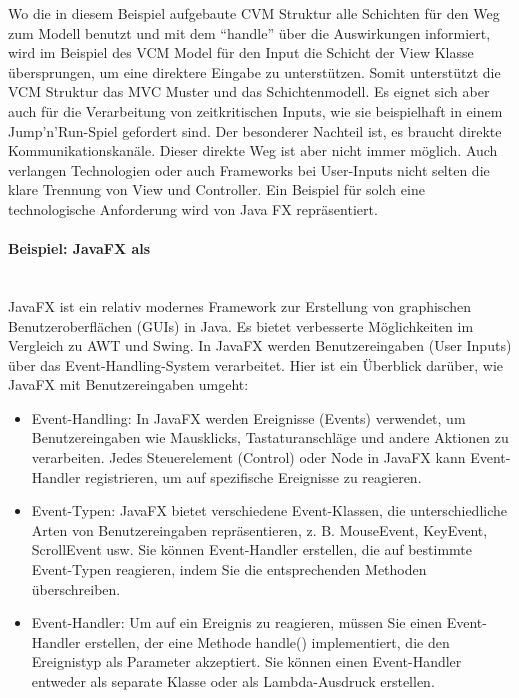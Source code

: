 Wo die in diesem Beispiel aufgebaute CVM Struktur alle Schichten für den Weg zum Modell benutzt und mit dem \enquote{handle} über die Auswirkungen informiert, wird im Beispiel des VCM Model für den Input die Schicht der View Klasse übersprungen, um eine direktere Eingabe zu unterstützen. Somit unterstützt die VCM Struktur das MVC Muster und das Schichtenmodell. Es eignet  sich aber auch für die Verarbeitung von zeitkritischen Inputs, wie sie beispielhaft in einem Jump'n'Run-Spiel gefordert sind. Der besonderer Nachteil ist, es braucht direkte Kommunikationskanäle. Dieser direkte Weg ist aber nicht immer möglich. Auch verlangen Technologien oder auch Frameworks bei User-Inputs nicht selten die klare Trennung von View und Controller. Ein Beispiel für solch eine technologische Anforderung wird von Java FX repräsentiert.     

\paragraph{Beispiel: JavaFX als\\\\}
JavaFX ist ein relativ modernes Framework zur Erstellung von graphischen Benutzeroberflächen (GUIs) in Java. Es bietet verbesserte Möglichkeiten im Vergleich zu AWT und Swing. In JavaFX werden Benutzereingaben (User Inputs) über das Event-Handling-System verarbeitet. Hier ist ein Überblick darüber, wie JavaFX mit Benutzereingaben umgeht:
\begin{itemize}
\item Event-Handling: In JavaFX werden Ereignisse (Events) verwendet, um Benutzereingaben wie Mausklicks, Tastaturanschläge und andere Aktionen zu verarbeiten. Jedes Steuerelement (Control) oder Node in JavaFX kann Event-Handler registrieren, um auf spezifische Ereignisse zu reagieren.
\item Event-Typen: JavaFX bietet verschiedene Event-Klassen, die unterschiedliche Arten von Benutzereingaben repräsentieren, z. B. MouseEvent, KeyEvent, ScrollEvent usw. Sie können Event-Handler erstellen, die auf bestimmte Event-Typen reagieren, indem Sie die entsprechenden Methoden überschreiben.
\item Event-Handler: Um auf ein Ereignis zu reagieren, müssen Sie einen Event-Handler erstellen, der eine Methode handle() implementiert, die den Ereignistyp als Parameter akzeptiert. Sie können einen Event-Handler entweder als separate Klasse oder als Lambda-Ausdruck erstellen.
 \end{itemize}   

